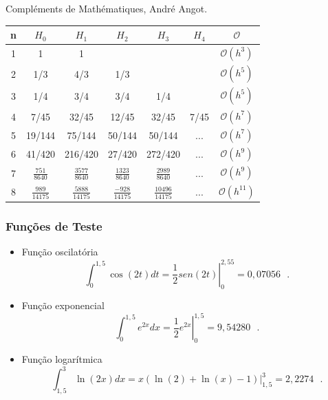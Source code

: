 \documentclass[xcolor=table]{beamer}
\begin{document}
\begin{frame}
Compléments de Mathématiques, André Angot.
\begin{center}
	\begin{tabular}{ c c c c c c c }
		\rowcolor{Maroon}
		n & $H_{0}$ & $H_{1}$ & $H_{2}$ & $H_{3}$ & $H_{4}$ & $\mathcal{O}$ \\ 
		\hline \hline
		\rowcolor{Maroon!50}
		1 & 1 & 1 & & & & $\mathcal{O}\left(h^{3}\right)$ \\  
		\rowcolor{Maroon!10}
		2 & 1/3 & 4/3 & 1/3 & & & $\mathcal{O}\left(h^{5}\right)$ \\  
		\rowcolor{Maroon!50}
		3 & 1/4 & 3/4 & 3/4 & 1/4 & & $\mathcal{O}\left(h^{5}\right)$  \\  
		\rowcolor{Maroon!10}
		4 & 7/45 & 32/45 & 12/45 & 32/45 & 7/45 & $\mathcal{O}\left(h^{7}\right)$ \\ 
		\rowcolor{Maroon!50}
		5 & 19/144 & 75/144 & 50/144 & 50/144 & $...$ & $\mathcal{O}\left(h^{7}\right)$ \\  
		\rowcolor{Maroon!10}
		6 & 41/420 & 216/420 & 27/420 & 272/420 & $...$ & $\mathcal{O}\left(h^{9}\right)$ \\ 
		\rowcolor{Maroon!50}
		7 & $ \frac{751}{8640} $ & $ \frac{3577}{8640}$ & $\frac{1323}{8640}$ & $\frac{2989}{8640}$ & $...$ & $\mathcal{O}\left(h^{9}\right)$ \\  
		\rowcolor{Maroon!10}
		8 & $ \frac{989}{14175}$ & $\frac{5888}{14175}$ & $\frac{-928}{14175}$ & $\frac{10496}{14175}$ & $...$ & $\mathcal{O}\left(h^{11}\right)$
	\end{tabular}
\end{center}
\end{frame}

\begin{frame}
\frametitle{Funções de Teste}
\begin{itemize}
	\item Função oscilatória
	\[ \int_{0}^{1,5} \cos(2t)dt = \left.\frac{1}{2} sen(2t) \right|_{0}^{2,55} = 0,07056 \ \ \ . \]
	\item Função exponencial
	\[ \int_{0}^{1,5} e^{2x}dx = \left.\frac{1}{2} e^{2x} \right|_{0}^{1,5} = 9,54280 \ \ \ . \]
	\item Função logarítmica
	\[ \int_{1,5}^{3} \ln(2x)dx = \left. x(\ln(2) + \ln(x) - 1) \right|_{1,5}^{3} = 2,2274 \ \ \ . \]
\end{itemize}
\end{frame}
\end{document}
